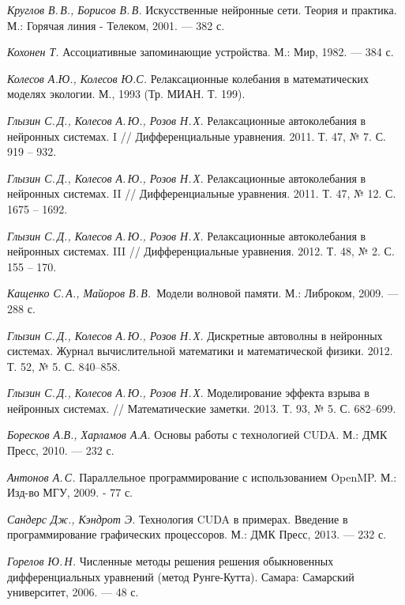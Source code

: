 \documentclass[a4paper, 14pt]{extarticle}
\theoremstyle{definition}
\begin{document}
\begin{thebibliography}{99}

\textit{Круглов В.\,В., Борисов В.\,В. } 
{Искусственные нейронные сети. Теория и практика. 
М.: Горячая линия - Телеком, 2001. — 382 с. } 

\textit{Кохонен Т. } 
{Ассоциативные запоминающие устройства. 
М.: Мир, 1982. — 384 с. } 

\textit{Колесов А.\;Ю., Колесов Ю.\;С. } 
{Релаксационные колебания в математических моделях экологии. 
М., 1993 (Тр. МИАН. Т. 199).}

\textit{Глызин С.\,Д., Колесов А.\,Ю., Розов Н.\,Х. } 
{Релаксационные автоколебания в нейронных системах. I
// Дифференциальные уравнения. 2011. Т. 47, № 7. С. 919 – 932. } 

\textit{Глызин С.\,Д., Колесов А.\,Ю., Розов Н.\,Х. } 
{Релаксационные автоколебания в нейронных системах. II
// Дифференциальные уравнения. 2011. Т. 47, № 12. С. 1675 – 1692. } 

\textit{Глызин С.\,Д., Колесов А.\,Ю., Розов Н.\,Х. } 
{Релаксационные автоколебания в нейронных системах. III
// Дифференциальные уравнения. 2012. Т. 48, № 2. С. 155 – 170. }

\textit{Кащенко С.\,А., Майоров В.\,В.\, } 
{Модели волновой памяти. 
М.: Либроком, 2009. — 288 с. }  

\textit{Глызин С.\,Д., Колесов А.\,Ю., Розов Н.\,Х. } 
{Дискретные автоволны в нейронных системах.
Журнал вычислительной математики и математической физики. 2012. Т. 52, № 5. С. 840–858. } 

\textit{Глызин С.\,Д., Колесов А.\,Ю., Розов Н.\,Х. } 
{Моделирование эффекта взрыва в нейронных системах.
// Математические заметки. 2013. Т. 93, № 5. С. 682–699. } 

\textit{Боресков А.\;В., Харламов А.\;А. } 
{Основы работы с технологией CUDA. 
М.: ДМК Пресс, 2010. — 232 с. } 

\textit{Антонов А.\,С. } 
{Параллельное программирование с использованием OpenMP. 
М.: Изд-во МГУ, 2009. - 77 с. } 

\textit{Сандерс Дж., Кэндрот Э. } 
{Технология CUDA в примерах. Введение в программирование графических процессоров. 
М.: ДМК Пресс, 2013. — 232 с. } 

\textit{Горелов Ю.\,Н. } 
{Численные методы решения решения обыкновенных дифференциальных уравнений (метод Рунге-Кутта).
Самара: Самарский университет, 2006. — 48 с. } 


\end{thebibliography}
\end{document}
